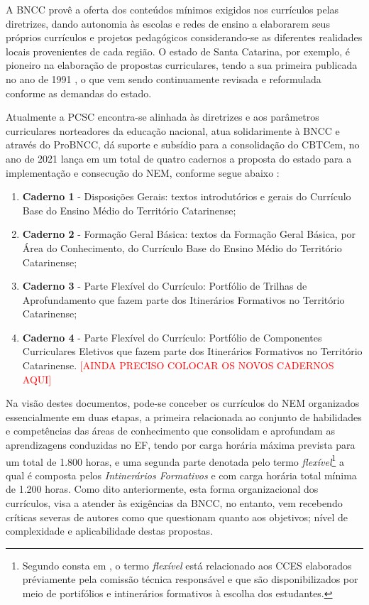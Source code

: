 A \ac{BNCC} provê a oferta dos conteúdos mínimos exigidos nos currículos pelas diretrizes, dando autonomia às escolas e redes de ensino a elaborarem seus próprios currículos e projetos pedagógicos considerando-se as diferentes realidades locais provenientes de cada região. O estado de Santa Catarina, por exemplo, é pioneiro na elaboração de propostas curriculares, tendo a sua primeira publicada no ano de 1991 \cite{CATARINA:1991}, o que vem sendo continuamente revisada e reformulada conforme as demandas do estado.

Atualmente a \ac{PCSC} encontra-se alinhada às diretrizes e aos parâmetros curriculares norteadores da educação nacional, atua solidarimente à \ac{BNCC} e  através do \ac{ProBNCC}, dá suporte e subsídio para a consolidação do \ac{CBTCem}, no ano de 2021 lança em um total de quatro cadernos a proposta do estado para a implementação e consecução do \ac{NEM}, conforme segue abaixo \cite{CATARINA:2021}:

\begin{enumerate}[label=\Roman *)]
	\item \textbf{Caderno 1} - Disposições Gerais: textos introdutórios e gerais do Currículo Base do Ensino Médio do Território Catarinense;
	\item \textbf{Caderno 2} - Formação Geral Básica: textos da Formação Geral Básica, por Área do Conhecimento, do Currículo Base do Ensino Médio do Território Catarinense;
	\item \textbf{Caderno 3} - Parte Flexível do Currículo: Portfólio de Trilhas de Aprofundamento que fazem parte dos Itinerários Formativos no Território Catarinense;
	\item \textbf{Caderno 4} - Parte Flexível do Currículo: Portfólio de Componentes Curriculares Eletivos que fazem parte dos Itinerários Formativos no Território Catarinense.
		\textcolor{red}{[AINDA PRECISO COLOCAR OS NOVOS CADERNOS AQUI]}
\end{enumerate}

Na visão destes documentos, pode-se conceber os currículos do \ac{NEM} organizados essencialmente em duas etapas, a primeira relacionada ao conjunto de habilidades e competências das áreas de conhecimento que consolidam e aprofundam as aprendizagens conduzidas no \ac{EF}, tendo por carga horária máxima prevista para um total de 1.800 horas, e uma segunda parte denotada pelo termo \textit{flexível}\footnote{Segundo consta em \cite{CATARINA:2021d}, o termo \textit{flexível} está relacionado aos \ac{CCES} elaborados préviamente pela comissão técnica responsável e que são disponibilizados por meio de portifólios e intinerários formativos à escolha dos estudantes.} a qual é composta pelos \textit{Intinerários Formativos} e com carga horária total mínima de 1.200 horas. Como dito anteriormente, esta forma organizacional dos currículos, visa a atender às exigências da \ac{BNCC}, no entanto, vem recebendo críticas severas de autores como \cite{OSTERMANN:2021,ERICK:2020} que questionam quanto aos objetivos; nível de complexidade e aplicabilidade destas propostas.


